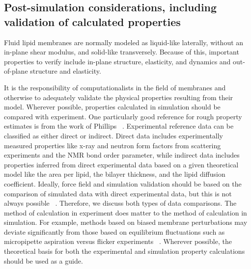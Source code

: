\documentclass[9pt,bestpractices,pubversion]{livecoms}
\begin{document}
\subsection{Post-simulation considerations, including validation of calculated properties}
\label{subsec:postsim3}
Fluid lipid membranes are normally modeled as liquid-like laterally, without an in-plane shear modulus, and solid-like transversely.
Because of this, important properties to verify include in-plane structure, elasticity, and dynamics and out-of-plane structure and elasticity.

It is the responsibility of computationalists in the field of membranes and otherwise to adequately validate the physical properties resulting from their model.
Wherever possible, properties calculated in simulation should be compared with experiment.
One particularly good reference for rough property estimates is from the work of Phillips ~\cite{Phillips2017}.
Experimental reference data can be classified as either direct or indirect.
Direct data includes experimentally measured properties like x-ray and neutron form factors from scattering experiments and the NMR bond order parameter, while indirect data includes properties inferred from direct experimental data based on a given theoretical model like the area per lipid, the bilayer thickness, and the lipid diffusion coefficient.
Ideally, force field and simulation validation should be based on the comparison of simulated data with direct experimental data, but this is not always possible ~\cite{Poger2016}.
Therefore, we discuss both types of data comparisons.
The method of calculation in experiment does matter to the method of calculation in simulation.
For example, methods based on biased membrane perturbations may deviate significantly from those based on equilibrium fluctuations such as micropipette aspiration versus flicker experiments ~\cite{Venable2015}.
Wherever possible, the theoretical basis for both the experimental and simulation property calculations should be used as a guide.
\end{document}
